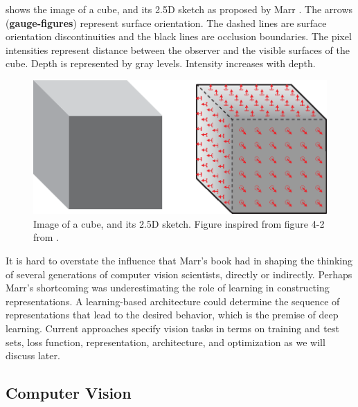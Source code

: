 \Fig{\ref{fig:sketch}} shows the image of a cube, and its
2.5D
sketch as proposed by Marr \cite{Marr82}. The arrows ({\bf gauge-figures}) represent surface orientation. The dashed lines are surface orientation discontinuities and the black lines are occlusion boundaries. The pixel intensities represent distance between the observer and the visible surfaces of the cube. Depth is represented by gray levels. Intensity increases with depth.




\begin{figure}[t]
    \centerline{
        \includegraphics[width=.9\linewidth]{figures/taxonomy/sketch.eps}
    }
    \caption{Image of a cube, and its
        2.5D
        sketch. Figure inspired from figure 4-2 from \cite{Marr82}.}
    \label{fig:sketch}
\end{figure}



It is hard to overstate the influence that Marr’s book had in shaping the thinking of several generations of computer vision scientists, directly or indirectly.
Perhaps Marr's shortcoming was underestimating the role of learning in constructing representations. A learning-based architecture could
determine the sequence of representations that lead to the desired behavior, which is the premise of deep learning.  Current approaches specify vision tasks in terms on training and test sets, loss function, representation, architecture, and optimization as we will discuss later.



\subsection{Computer Vision}

